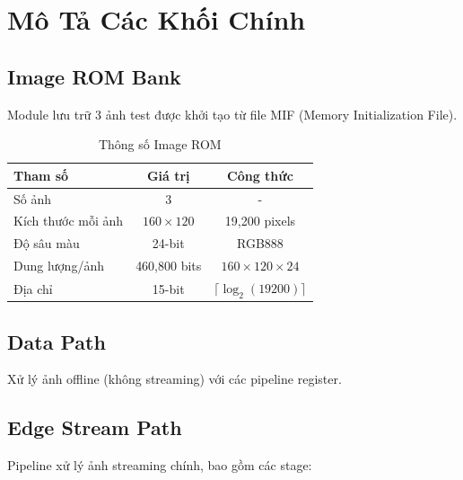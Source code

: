 \documentclass[12pt,a4paper]{report}
\begin{document}
\section{Mô Tả Các Khối Chính}

\subsection{Image ROM Bank}
Module lưu trữ 3 ảnh test được khởi tạo từ file MIF (Memory Initialization File).

\begin{table}[H]
\centering
\caption{Thông số Image ROM}
\begin{tabular}{|l|c|c|}
\hline
\textbf{Tham số} & \textbf{Giá trị} & \textbf{Công thức} \\
\hline
Số ảnh & 3 & - \\
Kích thước mỗi ảnh & $160 \times 120$ & 19,200 pixels \\
Độ sâu màu & 24-bit & RGB888 \\
Dung lượng/ảnh & 460,800 bits & $160 \times 120 \times 24$ \\
Địa chỉ & 15-bit & $\lceil\log_2(19200)\rceil$ \\
\hline
\end{tabular}
\end{table}

\subsection{Data Path}
Xử lý ảnh offline (không streaming) với các pipeline register.

\subsection{Edge Stream Path}
Pipeline xử lý ảnh streaming chính, bao gồm các stage:
\end{document}
